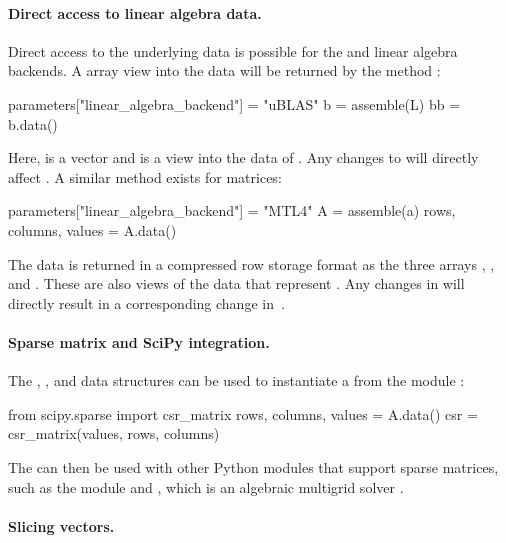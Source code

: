 

\paragraph{Direct access to linear algebra data.}

Direct access to the underlying data is possible for the 
and  linear algebra backends. A \numpy array view into the
data will be returned by the method :
\begin{python}
parameters["linear_algebra_backend"] = "uBLAS"
b  = assemble(L)
bb = b.data()
\end{python}
Here,  is a  vector and  is a \numpy view
into the data of . Any changes to  will directly affect
. A similar method exists for matrices:
\begin{python}
parameters["linear_algebra_backend"] = "MTL4"
A = assemble(a)
rows, columns, values = A.data()
\end{python}
The data is returned in a compressed row storage format as the three
\numpy arrays , , and . These are also
views of the data that represent . Any changes in 
will directly result in a corresponding change in~.

\paragraph{Sparse matrix and SciPy integration.}

The , , and  data structures can
be used to instantiate a  from the 
module \citep{JonesOliphantPetersonEtAl2009}:
\begin{python}
from scipy.sparse import csr_matrix
rows, columns, values = A.data()
csr = csr_matrix(values, rows, columns)
\end{python}
The  can then be used with other Python modules
that support sparse matrices, such as the 
module and , which is an algebraic multigrid solver
\citep{BellOlsonSchroder2009}.

\paragraph{Slicing vectors.}

